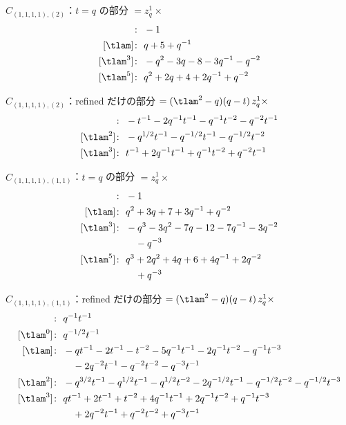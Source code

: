$\hat C_{(1,1,1,1),(2)}$：$t = q$ の部分 $= z_q^{1} \times$
\begin{align*}
[\tlam^{-1}]\colon\ & -1 \\
[\tlam]\colon\ & q +5 +q^{-1} \\
[\tlam^{3}]\colon\ & -q^{2} -3 q -8 -3 q^{-1} -q^{-2} \\
[\tlam^{5}]\colon\ & q^{2} +2 q +4 +2 q^{-1} +q^{-2}
\end{align*}

$\hat C_{(1,1,1,1),(2)}$：refined だけの部分 $= (\tlam^2 - q)(q - t)\, z_q^{1} \times$
\begin{align*}
[\tlam]\colon\ & -t^{-1} -2 q^{-1} t^{-1} -q^{-1} t^{-2} -q^{-2} t^{-1} \\
[\tlam^{2}]\colon\ & -q^{1/2} t^{-1} -q^{-1/2} t^{-1} -q^{-1/2} t^{-2} \\
[\tlam^{3}]\colon\ & t^{-1} +2 q^{-1} t^{-1} +q^{-1} t^{-2} +q^{-2} t^{-1}
\end{align*}

$\hat C_{(1,1,1,1),(1,1)}$：$t = q$ の部分 $= z_q^{1} \times$
\begin{align*}
[\tlam^{-1}]\colon\ & -1 \\
[\tlam]\colon\ & q^{2} +3 q +7 +3 q^{-1} +q^{-2} \\
[\tlam^{3}]\colon\ & -q^{3} -3 q^{2} -7 q -12 -7 q^{-1} -3 q^{-2} \\
& \quad -q^{-3} \\
[\tlam^{5}]\colon\ & q^{3} +2 q^{2} +4 q +6 +4 q^{-1} +2 q^{-2} \\
& \quad +q^{-3}
\end{align*}

$\hat C_{(1,1,1,1),(1,1)}$：refined だけの部分 $= (\tlam^2 - q)(q - t)\, z_q^{1} \times$
\begin{align*}
[\tlam^{-1}]\colon\ & q^{-1} t^{-1} \\
[\tlam^{0}]\colon\ & q^{-1/2} t^{-1} \\
[\tlam]\colon\ & -q t^{-1} -2 t^{-1} -t^{-2} -5 q^{-1} t^{-1} -2 q^{-1} t^{-2} -q^{-1} t^{-3} \\
& \quad -2 q^{-2} t^{-1} -q^{-2} t^{-2} -q^{-3} t^{-1} \\
[\tlam^{2}]\colon\ & -q^{3/2} t^{-1} -q^{1/2} t^{-1} -q^{1/2} t^{-2} -2 q^{-1/2} t^{-1} -q^{-1/2} t^{-2} -q^{-1/2} t^{-3} \\
[\tlam^{3}]\colon\ & q t^{-1} +2 t^{-1} +t^{-2} +4 q^{-1} t^{-1} +2 q^{-1} t^{-2} +q^{-1} t^{-3} \\
& \quad +2 q^{-2} t^{-1} +q^{-2} t^{-2} +q^{-3} t^{-1}
\end{align*}
